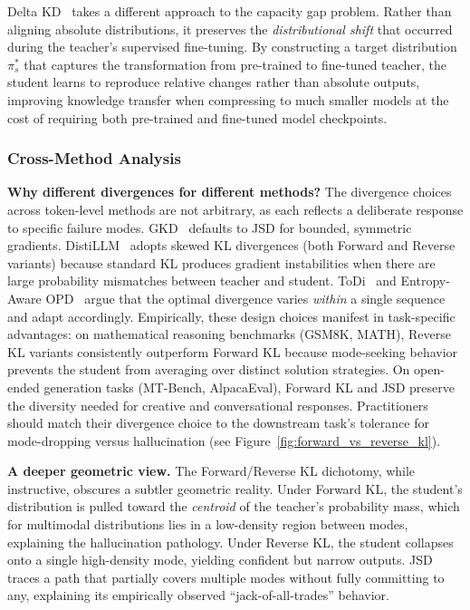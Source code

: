 \documentclass{article} %
\begin{document}
Delta KD~\citep{2509.14526} takes a different approach to the capacity gap problem. Rather than aligning absolute distributions, it preserves the \emph{distributional shift} that occurred during the teacher's supervised fine-tuning. By constructing a target distribution $\pi_s^*$ that captures the transformation from pre-trained to fine-tuned teacher, the student learns to reproduce relative changes rather than absolute outputs, improving knowledge transfer when compressing to much smaller models at the cost of requiring both pre-trained and fine-tuned model checkpoints.

\subsubsection{Cross-Method Analysis}

\textbf{Why different divergences for different methods?}
The divergence choices across token-level methods are not arbitrary, as each reflects a deliberate response to specific failure modes. GKD~\citep{2306.13649} defaults to JSD for bounded, symmetric gradients. DistiLLM~\citep{2402.03898} adopts skewed KL divergences (both Forward and Reverse variants) because standard KL produces gradient instabilities when there are large probability mismatches between teacher and student. ToDi~\citep{2505.16297} and Entropy-Aware OPD~\citep{2603.07079} argue that the optimal divergence varies \emph{within} a single sequence and adapt accordingly. Empirically, these design choices manifest in task-specific advantages: on mathematical reasoning benchmarks (GSM8K, MATH), Reverse KL variants consistently outperform Forward KL because mode-seeking behavior prevents the student from averaging over distinct solution strategies. On open-ended generation tasks (MT-Bench, AlpacaEval), Forward KL and JSD preserve the diversity needed for creative and conversational responses. Practitioners should match their divergence choice to the downstream task's tolerance for mode-dropping versus hallucination (see Figure~\ref{fig:forward_vs_reverse_kl}).

\textbf{A deeper geometric view.}
The Forward/Reverse KL dichotomy, while instructive, obscures a subtler geometric reality. Under Forward KL, the student's distribution is pulled toward the \emph{centroid} of the teacher's probability mass, which for multimodal distributions lies in a low-density region between modes, explaining the hallucination pathology. Under Reverse KL, the student collapses onto a single high-density mode, yielding confident but narrow outputs. JSD traces a path that partially covers multiple modes without fully committing to any, explaining its empirically observed ``jack-of-all-trades'' behavior.
\end{document}
